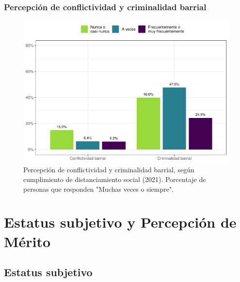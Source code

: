 \documentclass[
  12pt,
]{book}
\begin{document}
\hypertarget{percepciuxf3n-de-conflictividad-y-criminalidad-barrial}{%
\subsection{Percepción de conflictividad y criminalidad barrial}\label{percepciuxf3n-de-conflictividad-y-criminalidad-barrial}}

\begin{figure}

{\centering \includegraphics{reporte-elsoc_files/figure-latex/dist-barrio-1} 

}

\caption{Percepción de conflictividad y criminalidad barrial, según cumplimiento de distanciamiento social (2021). Porcentaje de personas que responden "Muchas veces o siempre".}\label{fig:dist-barrio}
\end{figure}

\hypertarget{estatus-subjetivo-y-percepciuxf3n-de-muxe9rito}{%
\chapter{Estatus subjetivo y Percepción de Mérito}\label{estatus-subjetivo-y-percepciuxf3n-de-muxe9rito}}

\hypertarget{estatus-subjetivo}{%
\section{Estatus subjetivo}\label{estatus-subjetivo}}
\end{document}
